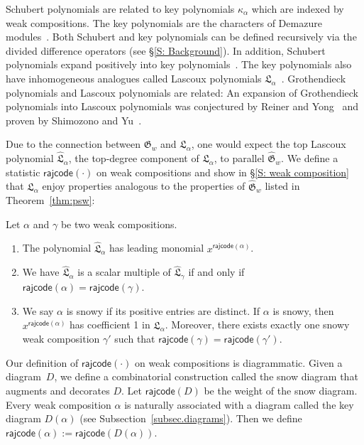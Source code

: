 \documentclass[10pt]{amsart}
\theoremstyle{plain}
\theoremstyle{plain}
\theoremstyle{definition}
\theoremstyle{definition}
\theoremstyle{definition}
\theoremstyle{plain}
\theoremstyle{plain}
\theoremstyle{plain}
\theoremstyle{plain}
\theoremstyle{plain}
\theoremstyle{remark}
\theoremstyle{remark}
\theoremstyle{plain}
\theoremstyle{plain}
\newcommand{\fG}{\mathfrak{G}}
\newcommand{\fGb}{\fG}
\newcommand{\fL}{\mathfrak{L}}
\newcommand{\fLb}{\fL}
\newcommand{\topLas}{\widehat{\fL}}
\newcommand{\topGro}{\widehat{\fG}}
\newcommand{\rajcode}{\mathsf{rajcode}}
\begin{document}
Schubert polynomials are related
to key polynomials $\kappa_\alpha$
which are indexed by weak compositions.
The key polynomials are the characters of 
Demazure modules~\cite{De}.
Both Schubert and key polynomials 
can be defined recursively 
via the divided difference operators 
(see \S\ref{S: Background}).
In addition, Schubert polynomials
expand positively into key polynomials~\cite{RS}.
The key polynomials also have
inhomogeneous analogues called Lascoux polynomials $\fLb_\alpha$~\cite{Las}.
Grothendieck polynomials and Lascoux polynomials are related: 
An expansion of Grothendieck polynomials into Lascoux polynomials 
was conjectured by Reiner and Yong~\cite{RY} and 
proven by Shimozono and Yu~\cite{SY}.

Due to the connection between $\fGb_w$ and $\fLb_\alpha$, one would expect the top Lascoux polynomial $\topLas_\alpha$, the top-degree component of $\fLb_\alpha$, to parallel $\topGro_w$. 
We define a statistic $\rajcode(\cdot)$ on weak compositions and show in \S\ref{S: weak composition} that $\topLas_\alpha$ enjoy properties analogous to the properties of $\topGro_w$ listed in Theorem~\ref{thm:psw}:


\begin{ourthm}
\label{T: Top Las}
Let $\alpha$ and $\gamma$ be two weak compositions. 
\begin{enumerate}
\item[(a)]
The polynomial $\topLas_\alpha$ has leading monomial $x^{\rajcode(\alpha)}$.
\item[(b)] We have
$\topLas_\alpha$ is a scalar multiple of $\topLas_{\gamma}$
if and only if $\rajcode(\alpha) = \rajcode(\gamma)$.
\item[(c)] 
We say $\alpha$ is snowy if its
positive entries are distinct.
If $\alpha$ is snowy, then $x^{\rajcode(\alpha)}$ has coefficient 1 in $\topLas_\alpha$.
Moreover, 
there exists exactly one snowy weak composition $\gamma'$ 
such that $\rajcode(\gamma) = \rajcode(\gamma')$.
\end{enumerate}     
\end{ourthm}

Our definition of $\rajcode(\cdot)$
on weak compositions is diagrammatic. 
Given a diagram~$D$, 
we define a combinatorial
construction called the snow diagram 
that augments and decorates $D$.
Let $\rajcode(D)$
be the weight of the snow diagram.
Every weak composition $\alpha$ is naturally
associated with a diagram called
the key diagram $D(\alpha)$
(see Subsection~\ref{subsec.diagrams}).
Then we define $\rajcode(\alpha):=\rajcode(D(\alpha))$.
\end{document}
